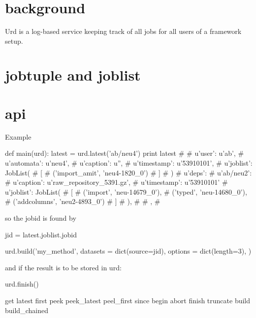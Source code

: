 \section{background}
Urd is a log-based service keeping track of all jobs for all users of
a framework setup.


\section{jobtuple and joblist}


\section{api}
Example

\begin{python}
def main(urd):
  latest = urd.latest('ab/neu4')
  print latest
#{
#  u'user': u'ab',
#  u'automata': u'neu4',
#  u'caption': u'',
#  u'timestamp': u'53910101',
#  u'joblist': JobList(
#    [
#      ('import_amit', 'neu4-1820_0')
#    ]
#  )
#  u'deps': {
#    u'ab/neu2': {
#      u'caption': u'raw_repository_5391.gz',
#      u'timestamp': u'53910101'
#      u'joblist': JobList(
#        [
#          ('import', 'neu-14679_0'),
#          ('typed', 'neu-14680_0'),
#          ('addcolumns', 'neu2-4893_0')
#        ]
#      ),
#    }
#  },
#}
\end{python}
so the jobid is found by

\begin{python}
  jid = latest.joblist.jobid

  urd.build('my_method',
    datasets = dict(source=jid),
    options = dict(length=3),
  )
\end{python}
and if the result is to be stored in urd:

\begin{python}
  urd.finish()
\end{python}


get
latest
first
peek
peek\_latest
peel\_first
since
begin
abort
finish
truncate
build
build\_chained


